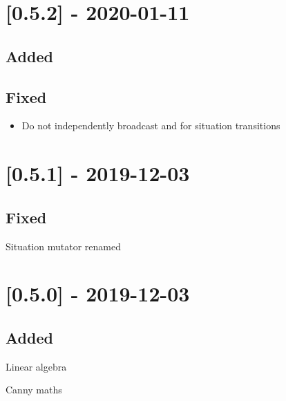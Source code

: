 \section{[0.5.2] - 2020-01-11}

\subsection{Added}

\begin{shortlist}
    \item {}
\end{shortlist}

\subsection{Fixed}

\begin{itemize}
    \item Do not independently broadcast  and  for situation transitions
\end{itemize}

\section{[0.5.1] - 2019-12-03}

\subsection{Fixed}

\begin{shortlist}
    \item Situation mutator renamed 
\end{shortlist}

\section{[0.5.0] - 2019-12-03}

\subsection{Added}

\begin{shortlist}
    \item Linear algebra
    \item Canny maths
\end{shortlist}

